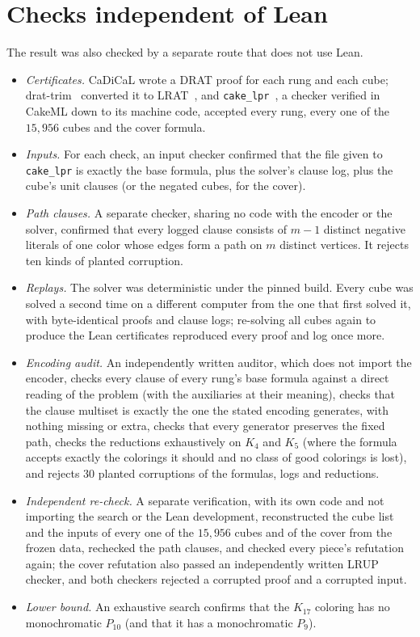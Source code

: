 \section{Checks independent of Lean}\label{sec:separate}

The result was also checked by a separate route that does not use
Lean.

\begin{itemize}[leftmargin=*]
\item \emph{Certificates.} CaDiCaL wrote a DRAT proof for each rung and
each cube; drat-trim~\cite{WHH14} converted it to LRAT~\cite{CHH+17}, and
\texttt{cake\_lpr}~\cite{THM21}, a checker verified in CakeML down to its
machine code, accepted every rung, every one of the $15{,}956$ cubes and
the cover formula.
\item \emph{Inputs.} For each check, an input checker confirmed that the
file given to \texttt{cake\_lpr} is exactly the base formula,
plus the solver's clause log, plus the cube's unit clauses (or the negated
cubes, for the cover).
\item \emph{Path clauses.} A separate checker, sharing no code with the
encoder or the solver, confirmed that every logged clause consists of
$m-1$ distinct negative literals of one color whose edges form a path on
$m$ distinct vertices. It rejects ten kinds of planted corruption.
\item \emph{Replays.} The solver was deterministic under the pinned build. Every cube was solved a
second time on a different computer from the one that first solved it,
with byte-identical proofs and clause logs; re-solving all cubes again to
produce the Lean certificates reproduced every proof and log once more.
\item \emph{Encoding audit.} An independently written auditor, which does
not import the encoder, checks every clause of every rung's base formula
against a direct reading of the problem (with the auxiliaries at their
meaning), checks that the clause multiset is exactly the one the stated
encoding generates, with nothing missing or extra, checks that every
generator preserves the fixed path, checks the reductions exhaustively on
$K_4$ and $K_5$ (where the formula accepts exactly the colorings it should
and no class of good colorings is lost), and rejects $30$ planted
corruptions of the formulas, logs and reductions.
\item \emph{Independent re-check.} A separate verification, with its own
code and not importing the search or the Lean development, reconstructed
the cube list and the inputs of every one of the $15{,}956$ cubes and of
the cover from the frozen data, rechecked the path clauses, and checked
every piece's refutation again; the cover refutation also passed an
independently written LRUP checker, and both checkers rejected a corrupted
proof and a corrupted input.
\item \emph{Lower bound.} An exhaustive search confirms that the $K_{17}$
coloring has no monochromatic $P_{10}$ (and that it has a monochromatic
$P_9$).
\end{itemize}

